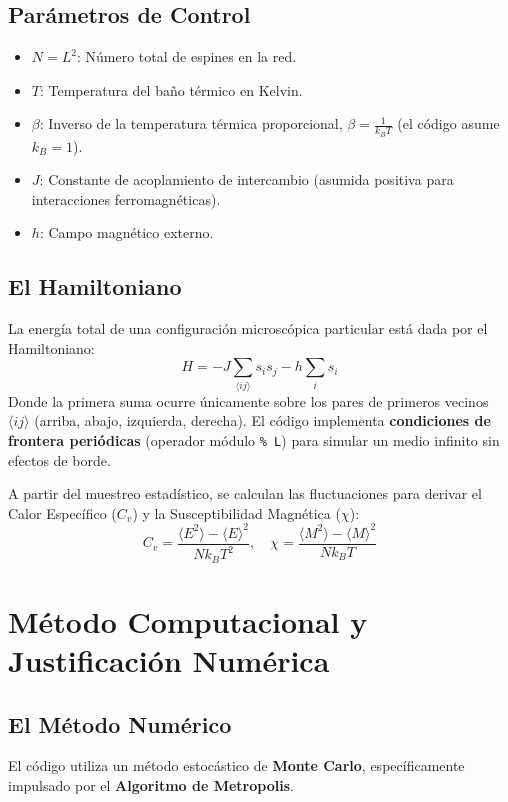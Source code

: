 \documentclass[11pt, a4paper]{article}
\begin{document}
\subsection*{Parámetros de Control}
\begin{itemize}
    \item $N = L^2$: Número total de espines en la red.
    \item $T$: Temperatura del baño térmico en Kelvin.
    \item $\beta$: Inverso de la temperatura térmica proporcional, $\beta = \frac{1}{k_B T}$ (el código asume $k_B = 1$).
    \item $J$: Constante de acoplamiento de intercambio (asumida positiva para interacciones ferromagnéticas).
    \item $h$: Campo magnético externo.
\end{itemize}

\subsection*{El Hamiltoniano}
La energía total de una configuración microscópica particular está dada por el Hamiltoniano:
\begin{equation}
    H = -J \sum_{\langle ij \rangle} s_i s_j - h \sum_i s_i
\end{equation}
Donde la primera suma ocurre únicamente sobre los pares de primeros vecinos $\langle ij \rangle$ (arriba, abajo, izquierda, derecha). El código implementa \textbf{condiciones de frontera periódicas} (operador módulo \texttt{\% L}) para simular un medio infinito sin efectos de borde.

A partir del muestreo estadístico, se calculan las fluctuaciones para derivar el Calor Específico ($C_v$) y la Susceptibilidad Magnética ($\chi$):
\begin{equation}
    C_v = \frac{\langle E^2 \rangle - \langle E \rangle^2}{N k_B T^2}, \quad \chi = \frac{\langle M^2 \rangle - \langle M \rangle^2}{N k_B T}
\end{equation}

\section{Método Computacional y Justificación Numérica}
\subsection*{El Método Numérico}
El código utiliza un método estocástico de \textbf{Monte Carlo}, específicamente impulsado por el \textbf{Algoritmo de Metropolis}. 
\end{document}

